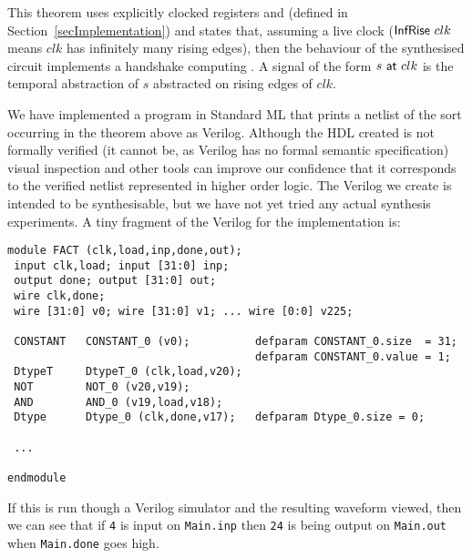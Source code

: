 \documentclass{llncs}
\begin{document}
\noindent This theorem uses explicitly clocked registers  and
 (defined in Section~\ref{secImplementation}) and states
that, assuming a live clock ($\mathsf{InfRise}~clk$ means $clk$
has infinitely many rising edges), then the behaviour of the
synthesised circuit implements a handshake computing
. A signal of the form $s~\mathsf{at}~clk$ is the temporal abstraction
of $s$ abstracted on rising edges of $clk$.

We have implemented a program in Standard ML that prints a netlist of
the sort occurring in the theorem above as Verilog. Although the HDL created is not
formally verified (it cannot be, as Verilog has no formal semantic
specification) visual inspection and other tools can improve our
confidence that it corresponds to the verified netlist
represented in higher order logic. The Verilog we create is intended
to be synthesisable, but we have not yet tried any actual synthesis
experiments. A tiny fragment of the Verilog for the 
implementation is:



{\footnotesize\baselineskip6pt\begin{verbatim}
module FACT (clk,load,inp,done,out);
 input clk,load; input [31:0] inp;
 output done; output [31:0] out;
 wire clk,done;
 wire [31:0] v0; wire [31:0] v1; ... wire [0:0] v225;

 CONSTANT   CONSTANT_0 (v0);          defparam CONSTANT_0.size  = 31;
                                      defparam CONSTANT_0.value = 1;
 DtypeT     DtypeT_0 (clk,load,v20);
 NOT        NOT_0 (v20,v19);
 AND        AND_0 (v19,load,v18);
 Dtype      Dtype_0 (clk,done,v17);   defparam Dtype_0.size = 0;

 ...

endmodule
\end{verbatim}}

\newpage

If this is run though a Verilog simulator and the
resulting waveform viewed, then we can see that if \texttt{4}
is input on \texttt{Main.inp} then \texttt{24} is
being output on \texttt{Main.out} when \texttt{Main.done} goes high.

\vspace*{5mm}


\mbox{}\hspace*{-5mm}
\end{document}
